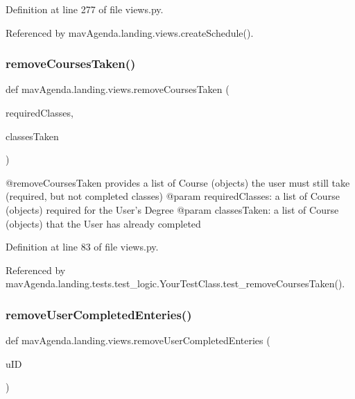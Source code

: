 Definition at line 277 of file views.\+py.



Referenced by mav\+Agenda.\+landing.\+views.\+create\+Schedule().

\mbox{\label{namespacemavAgenda_1_1landing_1_1views_a2027dcc5c86c3c172808656237104ac6}} 
\subsubsection{\texorpdfstring{remove\+Courses\+Taken()}{removeCoursesTaken()}}
{\footnotesize\ttfamily def mav\+Agenda.\+landing.\+views.\+remove\+Courses\+Taken (\begin{DoxyParamCaption}\item[{}]{required\+Classes,  }\item[{}]{classes\+Taken }\end{DoxyParamCaption})}

\begin{DoxyVerb}@removeCoursesTaken provides a list of Course (objects) the user must still take (required, but not completed classes)
@param requiredClasses: a list of Course (objects) required for the User's Degree
@param classesTaken: a list of Course (objects) that the User has already completed
\end{DoxyVerb}
 

Definition at line 83 of file views.\+py.



Referenced by mav\+Agenda.\+landing.\+tests.\+test\+\_\+logic.\+Your\+Test\+Class.\+test\+\_\+remove\+Courses\+Taken().

\mbox{\label{namespacemavAgenda_1_1landing_1_1views_ad44762f7b7b87274ee5b2bdd07fdf25a}} 
\subsubsection{\texorpdfstring{remove\+User\+Completed\+Enteries()}{removeUserCompletedEnteries()}}
{\footnotesize\ttfamily def mav\+Agenda.\+landing.\+views.\+remove\+User\+Completed\+Enteries (\begin{DoxyParamCaption}\item[{}]{u\+ID }\end{DoxyParamCaption})}

